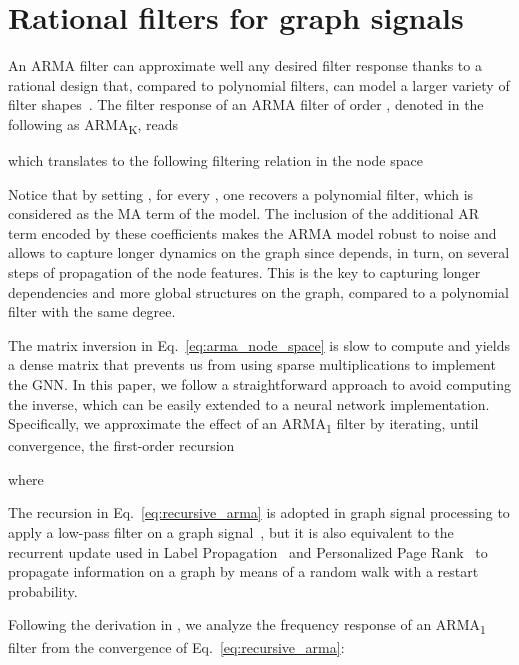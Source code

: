 \documentclass{article}
\begin{document}
\section{Rational filters for graph signals}
\label{sec:rational_filters}

An ARMA filter can approximate well any desired filter response  thanks to a rational design that, compared to polynomial filters, can model a larger variety of filter shapes~\cite{tremblay2018design}.
The filter response of an ARMA filter of order , denoted in the following as ARMA\textsubscript{K}, reads

which translates to the following filtering relation in the node space















Notice that by setting , for every , one recovers a polynomial filter, which is considered as the MA term of the model. The inclusion of the additional AR term encoded by these coefficients makes the ARMA model robust to noise and allows to capture longer dynamics on the graph since  depends, in turn, on several steps of propagation of the node features.
This is the key to capturing longer dependencies and more global structures on the graph, compared to a polynomial filter with the same degree.


The matrix inversion in Eq.~\eqref{eq:arma_node_space} is slow to compute and yields a dense matrix that prevents us from using sparse multiplications to implement the GNN.
In this paper, we follow a straightforward approach to avoid computing the inverse, which can be easily extended to a neural network implementation.
Specifically, we approximate the effect of an ARMA\textsubscript{1} filter by iterating, until convergence, the first-order recursion

where 


The recursion in Eq.~\eqref{eq:recursive_arma} is adopted in graph signal processing to apply a low-pass filter on a graph signal~\cite{loukas2015distributed,isufi2016autoregressive}, but it is also equivalent to the recurrent update used in Label Propagation~\cite{zhou2004learning} and Personalized Page Rank~\cite{page1999pagerank} to propagate information on a graph by means of a random walk with a restart probability.

Following the derivation in \cite{isufi2016autoregressive}, we analyze the frequency response of an ARMA\textsubscript{1} filter from the convergence of Eq.~\eqref{eq:recursive_arma}: 
\end{document}
